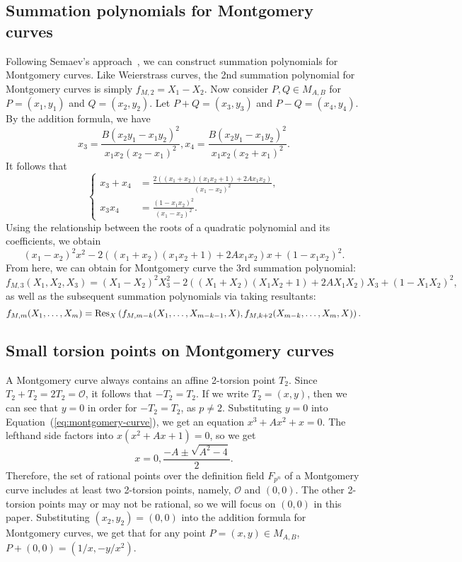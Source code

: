 \subsection{Summation polynomials for Montgomery curves}

Following Semaev's approach~\cite{DBLP:journals/iacr/Semaev04}, we can
construct summation polynomials for Montgomery curves.
%
Like Weierstrass curves, the 2nd summation polynomial for Montgomery
curves is simply $f_{M,2} = X_1 - X_2$.
%
Now consider $P,Q\in M_{A, B}$ for $P=(x_1, y_1)$ and $Q=(x_2, y_2)$.
%
Let $P+Q=(x_3, y_3)$ and $P-Q=(x_4, y_4)$.
%
By the addition formula, we have
\[ x_3 = \frac{B(x_2y_1 - x_1y_2)^2} {x_1x_2(x_2 - x_1)^2},
  x_4 =\frac{B(x_2y_1 - x_1y_2)^2} {x_1x_2(x_2 + x_1)^2}. \]
%
It follows that
%
\[ \left\{\begin{aligned} x_3 + x_4&=\frac{2\left((x_1 + x_2)(x_1x_2 + 1) + 2Ax_1x_2\right)}{(x_1 - x_2)^2}, \\
      x_3x_4&=\frac{(1 - x_1x_2)^2}{(x_1 - x_2)^2}.
    \end{aligned}\right. \]
%
Using the relationship between the roots of a quadratic polynomial and
its coefficients, we obtain
\[ (x_1 - x_2)^2x^2 - 2\left((x_1 + x_2)(x_1x_2 + 1) +
    2Ax_1x_2\right)x + (1 - x_1x_2)^2. \]
%
From here, we can obtain for Montgomery curve the 3rd summation
polynomial:
\[ f_{M,3}(X_1,X_2,X_3) = (X_1 - X_2)^2X_3^2 - 2\left((X_1 +
    X_2)(X_1X_2 + 1) + 2AX_1X_2\right)X_3 + (1-X_1X_2)^2, \]
%
as well as the subsequent summation polynomials via taking resultants:
\[ f_{M,m}(X_1,\ldots,X_m) =
  \operatorname{Res}_X\left(f_{M,m-k}(X_1,\ldots,X_{m-k-1},X),f_{M,k+2}(X_{m-k},\ldots,X_m,X)\right). \]

  
\subsection{Small torsion points on Montgomery
  curves} \label{subsec:TSPL}
A Montgomery curve always contains an affine 2-torsion point $T_2$.
%
Since $T_2+T_2=2T_2=\mathcal O$, it follows that $-T_2=T_2$.
%
If we write $T_2=(x,y)$, then we can see that $y=0$ in order for
$-T_2=T_2$, as $p\neq 2$.
%
Substituting $y=0$ into Equation~(\ref{eq:montgomery-curve}),
we get an equation $x^3+Ax^2+x=0$.
%
The lefthand side factors into $x(x^2+Ax+1)=0$, so we get \[
  x=0,\frac{-A\pm\sqrt{A^2 - 4}}{2}. \]
%
Therefore, the set of rational points over the definition field
$F_{p^n}$ of a Montgomery curve includes at least two 2-torsion
points, namely, $\mathcal O$ and $(0,0)$.
%
The other 2-torsion points may or may not be rational, so we will
focus on $(0,0)$ in this paper.
%
Substituting $(x_2,y_2)=(0,0)$ into the addition formula for
Montgomery curves, we get that for any point $P=(x,y)\in M_{A,B}$,
$P+(0,0)=(1/x,-y/x^2)$.


